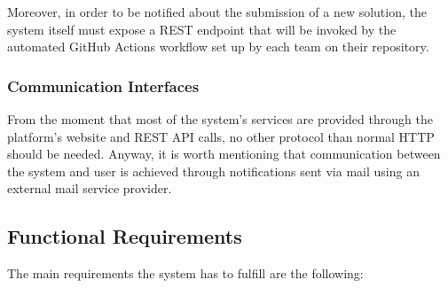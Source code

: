 Moreover, in order to be notified about the submission of a new solution, the system itself must expose a REST endpoint that will be invoked by the automated GitHub Actions workflow set up by each team on their repository.
\subsubsection{Communication Interfaces}
From the moment that most of the system’s services are provided through the platform’s website and REST API calls, no other protocol than normal HTTP should be needed. Anyway, it is worth mentioning that communication between the system and user is achieved through notifications sent via mail using an external mail service provider.

\subsection{Functional Requirements}
The main requirements the system has to fulfill are the following:
